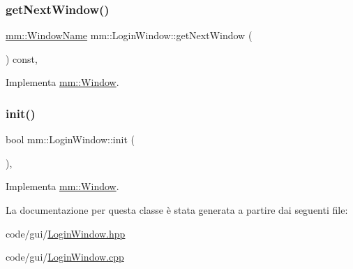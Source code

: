 \subsubsection{\texorpdfstring{get\+Next\+Window()}{getNextWindow()}}
{\footnotesize\ttfamily \mbox{\hyperlink{namespacemm_a4e9d92e04f65dbf2fc1963947da0d93c}{mm\+::\+Window\+Name}} mm\+::\+Login\+Window\+::get\+Next\+Window (\begin{DoxyParamCaption}{ }\end{DoxyParamCaption}) const\hspace{0.3cm}{\ttfamily [override]}, {\ttfamily [virtual]}}



Implementa \mbox{\hyperlink{classmm_1_1_window_a0cd7b4b0feb9505c44503547a161fcd8}{mm\+::\+Window}}.

\mbox{\label{classmm_1_1_login_window_a4040d7c1f85fc76e1f60ef13f92bef1c}} 
\subsubsection{\texorpdfstring{init()}{init()}}
{\footnotesize\ttfamily bool mm\+::\+Login\+Window\+::init (\begin{DoxyParamCaption}{ }\end{DoxyParamCaption})\hspace{0.3cm}{\ttfamily [override]}, {\ttfamily [virtual]}}



Implementa \mbox{\hyperlink{classmm_1_1_window_aba03fbf4761b2f106352baecf5996e10}{mm\+::\+Window}}.



La documentazione per questa classe è stata generata a partire dai seguenti file\+:\begin{DoxyCompactItemize}
\item 
code/gui/\mbox{\hyperlink{_login_window_8hpp}{Login\+Window.\+hpp}}\item 
code/gui/\mbox{\hyperlink{_login_window_8cpp}{Login\+Window.\+cpp}}\end{DoxyCompactItemize}
